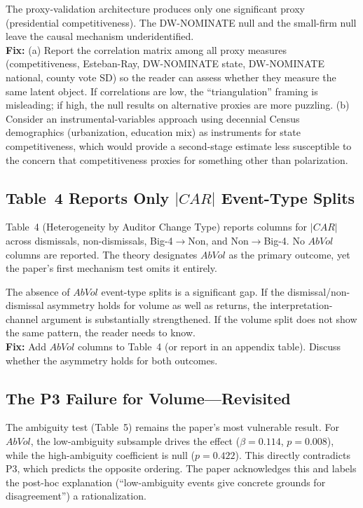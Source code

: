 \documentclass[11pt]{article}
\begin{document}
\begin{criticalbox}
The proxy-validation architecture produces only one significant proxy (presidential competitiveness). The DW-NOMINATE null and the small-firm null leave the causal mechanism underidentified.\\[4pt]
\textbf{Fix:} (a) Report the correlation matrix among all proxy measures (competitiveness, Esteban-Ray, DW-NOMINATE state, DW-NOMINATE national, county vote SD) so the reader can assess whether they measure the same latent object. If correlations are low, the ``triangulation'' framing is misleading; if high, the null results on alternative proxies are more puzzling. (b) Consider an instrumental-variables approach using decennial Census demographics (urbanization, education mix) as instruments for state competitiveness, which would provide a second-stage estimate less susceptible to the concern that competitiveness proxies for something other than polarization.
\end{criticalbox}

\subsection{Table~4 Reports Only $|CAR|$ Event-Type Splits}

Table~4 (Heterogeneity by Auditor Change Type) reports columns for $|CAR|$ across dismissals, non-dismissals, Big-4$\to$Non, and Non$\to$Big-4. No $AbVol$ columns are reported. The theory designates $AbVol$ as the primary outcome, yet the paper's first mechanism test omits it entirely.

\begin{criticalbox}
The absence of $AbVol$ event-type splits is a significant gap. If the dismissal/non-dismissal asymmetry holds for volume as well as returns, the interpretation-channel argument is substantially strengthened. If the volume split does not show the same pattern, the reader needs to know.\\[4pt]
\textbf{Fix:} Add $AbVol$ columns to Table~4 (or report in an appendix table). Discuss whether the asymmetry holds for both outcomes.
\end{criticalbox}

\subsection{The P3 Failure for Volume---Revisited}

The ambiguity test (Table~5) remains the paper's most vulnerable result. For $AbVol$, the low-ambiguity subsample drives the effect ($\beta = 0.114$, $p = 0.008$), while the high-ambiguity coefficient is null ($p = 0.422$). This directly contradicts P3, which predicts the opposite ordering. The paper acknowledges this and labels the post-hoc explanation (``low-ambiguity events give concrete grounds for disagreement'') a rationalization.
\end{document}
